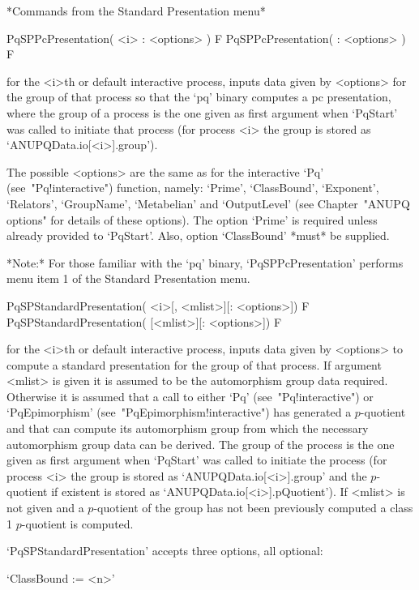 *Commands from the Standard Presentation menu*

\>PqSPPcPresentation( <i> : <options> ) F
\>PqSPPcPresentation( : <options> ) F

for the <i>th or default interactive {\ANUPQ} process, inputs data  given
by <options> for the group of  that  process  so  that  the  `pq'  binary
computes a pc presentation, where the group of a process is the one given
as first argument when `PqStart' was called to initiate that process (for
process <i> the group is stored as `ANUPQData.io[<i>].group').

The  possible  <options>  are  the  same  as  for  the  interactive  `Pq'
(see~"Pq!interactive")   function,   namely:    `Prime',    `ClassBound',
`Exponent', `Relators', `GroupName', `Metabelian' and `OutputLevel'  (see
Chapter~"ANUPQ options" for details of these options). The option `Prime'
is  required  unless  already  provided  to   `PqStart'.   Also,   option
`ClassBound' *must* be supplied.

*Note:* For those familiar with  the  `pq'  binary,  `PqSPPcPresentation'
performs menu item 1 of the Standard Presentation menu.

\>PqSPStandardPresentation( <i>[, <mlist>][: <options>]) F
\>PqSPStandardPresentation( [<mlist>][: <options>]) F

for the <i>th or default interactive {\ANUPQ} process, inputs data  given
by <options> to compute a standard presentation for  the  group  of  that
process.  If  argument  <mlist>  is  given  it  is  assumed  to  be   the
automorphism group data required. Otherwise it is assumed that a call  to
either      `Pq'      (see~"Pq!interactive")      or      `PqEpimorphism'
(see~"PqEpimorphism!interactive") has generated a $p$-quotient  and  that
{\GAP} can compute  its  automorphism  group  from  which  the  necessary
automorphism group data can be derived. The group of the process  is  the
one given as first argument when `PqStart' was  called  to  initiate  the
process (for process <i> the group is stored as `ANUPQData.io[<i>].group'
and     the     $p$-quotient     if     existent     is     stored     as
`ANUPQData.io[<i>].pQuotient').  If  <mlist>   is   not   given   and   a
$p$-quotient of the group has not been  previously  computed  a  class  1
$p$-quotient is computed.

`PqSPStandardPresentation' accepts three options, all optional:

\beginlist

\item{}`ClassBound := <n>'

